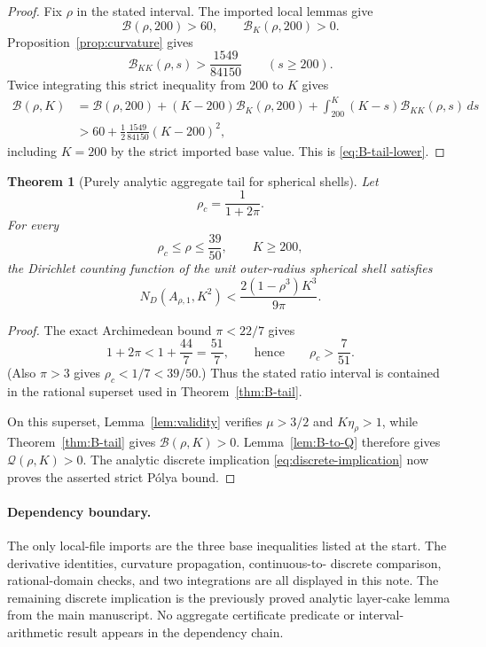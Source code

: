 \documentclass[11pt]{article}
\newtheorem{theorem}{Theorem}
\newcommand{\Bcal}{\mathcal B}
\newcommand{\Qcal}{\mathcal Q}
\begin{document}
\begin{proof}
Fix \(\rho\) in the stated interval.  The imported local lemmas give
\[
 \Bcal(\rho,200)>60,\qquad
 \Bcal_K(\rho,200)>0.
\]
Proposition~\ref{prop:curvature} gives
\[
 \Bcal_{KK}(\rho,s)>\frac{1549}{84150}
 \qquad(s\geq200).
\]
Twice integrating this strict inequality from \(200\) to \(K\) gives
\begin{align*}
 \Bcal(\rho,K)
 &=\Bcal(\rho,200)
 +(K-200)\Bcal_K(\rho,200)
 +\int_{200}^K(K-s)\Bcal_{KK}(\rho,s)\,ds\\
 &>60+\frac12\frac{1549}{84150}(K-200)^2,
\end{align*}
including \(K=200\) by the strict imported base value.  This is
\eqref{eq:B-tail-lower}.
\end{proof}

\begin{theorem}[Purely analytic aggregate tail for spherical shells]
\label{thm:aggregate-tail}
Let
\[
 \rho_c=\frac1{1+2\pi}.
\]
For every
\[
 \rho_c\leq\rho\leq\frac{39}{50},
 \qquad K\geq200,
\]
the Dirichlet counting function of the unit outer-radius spherical shell
satisfies
\[
 N_D(A_{\rho,1},K^2)
 <\frac{2(1-\rho^3)K^3}{9\pi}.
\]
\end{theorem}

\begin{proof}
The exact Archimedean bound \(\pi<22/7\) gives
\[
 1+2\pi<1+\frac{44}{7}=\frac{51}{7},
 \qquad\text{hence}\qquad
 \rho_c>\frac7{51}.
\]
(Also \(\pi>3\) gives \(\rho_c<1/7<39/50\).)
Thus the stated ratio interval is contained in the rational superset used
in Theorem~\ref{thm:B-tail}.

On this superset, Lemma~\ref{lem:validity} verifies
\(\mu>3/2\) and \(K\eta_\rho>1\), while
Theorem~\ref{thm:B-tail} gives \(\Bcal(\rho,K)>0\).
Lemma~\ref{lem:B-to-Q} therefore gives
\(\Qcal(\rho,K)>0\).  The analytic discrete implication
\eqref{eq:discrete-implication} now proves the asserted strict P\'olya
bound.
\end{proof}

\paragraph{Dependency boundary.}
The only local-file imports are the three base inequalities listed at the
start.  The derivative identities, curvature propagation, continuous-to-
discrete comparison, rational-domain checks, and two integrations are all
displayed in this note.  The remaining discrete implication is the
previously proved analytic layer-cake lemma from the main manuscript.
No aggregate certificate predicate or interval-arithmetic result appears in
the dependency chain.
\end{document}
